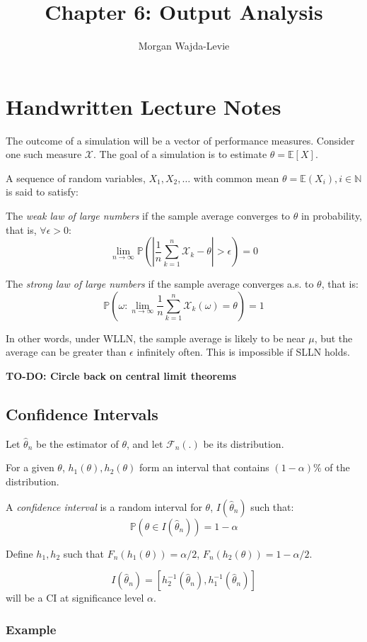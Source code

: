 \documentclass{article}
\title{Chapter 6: Output Analysis}
\author{Morgan Wajda-Levie}
\newcommand\Prob[1]{\mathbb P(#1)}
\begin{document}
\setcounter{section}{5}
\section{Handwritten Lecture Notes}

The outcome of a simulation will be a vector of performance measures.
Consider one such measure $\mathcal X$. The goal of a simulation is to
estimate $\theta = \mathbb E[X]$.

A sequence of random variables, $X_1, X_2, \ldots$ with common mean
$\theta = \mathbb E(X_i), i \in \mathbb N$ is said to satisfy:

The \emph{weak law of large numbers} if the sample average converges to
$\theta$ in probability, that is, $\forall \epsilon > 0$:
\[
    \lim_{n\to\infty}\Prob{\left| \frac{1}{n}\sum_{k=1}^n \mathcal X_k -
    \theta \right| > \epsilon} = 0
\]

The \emph{strong law of large numbers} if the sample average converges
a.s. to $\theta$, that is:
\[
    \Prob{\omega: \lim_{n\to\infty} \frac{1}{n}\sum_{k=1}^n \mathcal
    X_k(\omega) = \theta} = 1
\]

In other words, under WLLN, the sample average is likely to be near
$\mu$, but the average can be greater than $\epsilon$ infinitely often.
This is impossible if SLLN holds.

\textbf{TO-DO: Circle back on central limit theorems}

\subsection{Confidence Intervals}

Let $\hat\theta_n$ be the estimator of $\theta$, and let $\mathcal
F_n(.)$ be its distribution.

For a given $\theta$, $h_1(\theta), h_2(\theta)$ form an interval that
contains $(1 - \alpha)\%$ of the distribution.

A \emph{confidence interval} is a random interval for $\theta$,
$I(\hat\theta_n)$ such that:
\[
    \Prob{\theta \in I(\hat\theta_n)} = 1 - \alpha
\]

Define $h_1,h_2$ such that $F_n(h_1(\theta)) = \alpha/2$,
$F_n(h_2(\theta)) = 1 - \alpha/2$.

\[
    I(\hat\theta_n) = [h_2^{-1}(\hat\theta_n), h_1^{-1}(\hat\theta_n)]
\]
will be a CI at significance level $\alpha$.

\subsubsection{Example}
\end{document}
